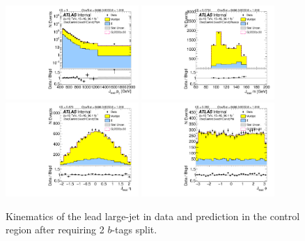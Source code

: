 \clearpage

\begin{figure}[htbp!]
\begin{center}
\includegraphics[width=0.45\textwidth,angle=-90]{figures/boosted/Control/b77_TwoTag_split_Control_leadHCand_Pt_m_1.pdf}
\includegraphics[width=0.45\textwidth,angle=-90]{figures/boosted/Control/b77_TwoTag_split_Control_leadHCand_Mass_s.pdf}\\
\includegraphics[width=0.45\textwidth,angle=-90]{figures/boosted/Control/b77_TwoTag_split_Control_leadHCand_Eta.pdf}
\includegraphics[width=0.45\textwidth,angle=-90]{figures/boosted/Control/b77_TwoTag_split_Control_leadHCand_Phi.pdf}
  \caption{Kinematics of the lead large-\R jet in data and prediction in the control region after requiring 2 $b$-tags split. }
  \label{fig:boosted-2bs-control-ak10-lead}
\end{center}
\end{figure}


